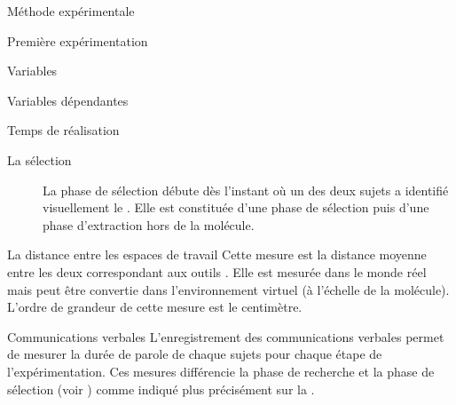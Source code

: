 \documentclass[myfrancais,ngerman,english,frenchb]{mythesis}
\begin{document}
\begin{mychapter}{Méthode expérimentale}
\begin{mysection}{Première expérimentation}
\begin{mysubsection}{Variables}
\begin{mysubsubsection}{Variables dépendantes}
\begin{myparagraph}{ Temps de réalisation}
\begin{description}
							\item[La sélection] La phase de sélection débute dès l'instant où un des deux sujets a identifié visuellement le .
								Elle est constituée d'une phase de sélection puis d'une phase d'extraction hors de la molécule.
						\end{description}
					\end{myparagraph}
					\begin{myparagraph}{ La distance entre les espaces de travail}
						Cette mesure est la distance moyenne entre les deux  correspondant aux outils .
						Elle est mesurée dans le monde réel mais peut être convertie dans l'environnement virtuel (à l'échelle de la molécule).
						L'ordre de grandeur de cette mesure est le centimètre.
					\end{myparagraph}
					\begin{myparagraph}{ Communications verbales}
						L'enregistrement des communications verbales permet de mesurer la durée de parole de chaque sujets pour chaque étape de l'expérimentation.
						Ces mesures différencie la phase de recherche et la phase de sélection (voir ) comme indiqué plus précisément sur la .


\end{myparagraph}
\end{mysubsubsection}
\end{mysubsection}
\end{mysection}
\end{mychapter}
\end{document}
